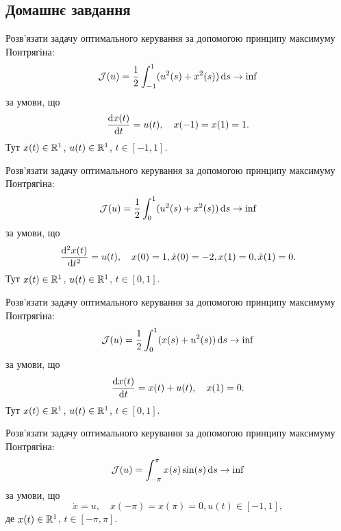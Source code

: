 \subsection{Домашнє завдання}

\begin{problem}
	Розв'язати задачу оптимального керування за допомогою принципу максимуму Понтрягіна: \[ \mathcal{J} (u) = \frac{1}{2} \int_{-1}^1 (u^2 (s) + x^2 (s)) \mathop{}\!\mathrm{d} s \to \inf \] за умови, що \[ \frac{\mathop{}\!\mathrm{d} x(t)}{\mathop{}\!\mathrm{d} t} = u (t), \quad x(-1) = x(1) = 1. \] Тут $x (t) \in \mathbb{R}^1$, $u (t) \in \mathbb{R}^1$, $t \in [-1, 1]$.
\end{problem}

\begin{solution}
\end{solution}

\begin{problem}
	Розв'язати задачу оптимального керування за допомогою принципу максимуму Понтрягіна: \[ \mathcal{J} (u) = \frac{1}{2} \int_0^1 (u^2 (s) + x^2 (s)) \mathop{}\!\mathrm{d} s \to \inf \] за умови, що \[ \frac{\mathop{}\!\mathrm{d}^2 x(t)}{\mathop{}\!\mathrm{d} t^2} = u (t), \quad x(0) = 1, \dot x(0) = -2, x(1) = 0, \dot x(1) = 0. \] Тут $x (t) \in \mathbb{R}^1$, $u (t) \in \mathbb{R}^1$, $t \in [0, 1]$.
\end{problem}

\begin{solution}
\end{solution}

\begin{problem}
	Розв'язати задачу оптимального керування за допомогою принципу максимуму Понтрягіна: \[ \mathcal{J} (u) = \frac{1}{2} \int_0^1 (x(s) + u^2 (s)) \mathop{}\!\mathrm{d} s \to \inf \] за умови, що \[ \frac{\mathop{}\!\mathrm{d} x(t)}{\mathop{}\!\mathrm{d} t} = x (t) + u (t), \quad x(1) = 0. \] Тут $x (t) \in \mathbb{R}^1$, $u (t) \in \mathbb{R}^1$, $t \in [0, 1]$.
\end{problem}

\begin{solution}
\end{solution}

\begin{problem}
	Розв'язати задачу оптимального керування за допомогою принципу максимуму Понтрягіна: \[ \mathcal{J} (u) = \int_{-\pi}^\pi x(s) \sin(s) \mathop{}\!\mathrm{d} s \to \inf \] за умови, що \[ \dot x = u, \quad x(-\pi) = x(\pi) = 0, u(t) \in [-1,1], \] де $x (t) \in \mathbb{R}^1$, $t \in [-\pi, \pi]$.
\end{problem}

\begin{solution}
\end{solution}
